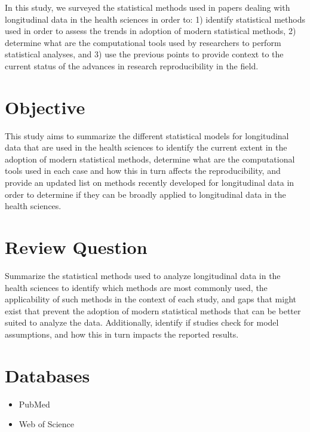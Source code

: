 \documentclass[
]{article}
\providecommand{\tightlist}{%
  \setlength{\itemsep}{0pt}\setlength{\parskip}{0pt}}\usepackage{longtable,booktabs,array}
\begin{document}
In this study, we surveyed the statistical methods used in papers
dealing with longitudinal data in the health sciences in order to: 1)
identify statistical methods used in order to assess the trends in
adoption of modern statistical methods, 2) determine what are the
computational tools used by researchers to perform statistical analyses,
and 3) use the previous points to provide context to the current status
of the advances in research reproducibility in the field.

\hypertarget{objective}{%
\section{Objective}\label{objective}}

This study aims to summarize the different statistical models for
longitudinal data that are used in the health sciences to identify the
current extent in the adoption of modern statistical methods, determine
what are the computational tools used in each case and how this in turn
affects the reproducibility, and provide an updated list on methods
recently developed for longitudinal data in order to determine if they
can be broadly applied to longitudinal data in the health sciences.

\hypertarget{review-question}{%
\section{Review Question}\label{review-question}}

Summarize the statistical methods used to analyze longitudinal data in
the health sciences to identify which methods are most commonly used,
the applicability of such methods in the context of each study, and gaps
that might exist that prevent the adoption of modern statistical methods
that can be better suited to analyze the data. Additionally, identify if
studies check for model assumptions, and how this in turn impacts the
reported results.

\hypertarget{databases}{%
\section{Databases}\label{databases}}

\begin{itemize}
\tightlist
\item
  PubMed
\item
  Web of Science
\end{itemize}
\end{document}
